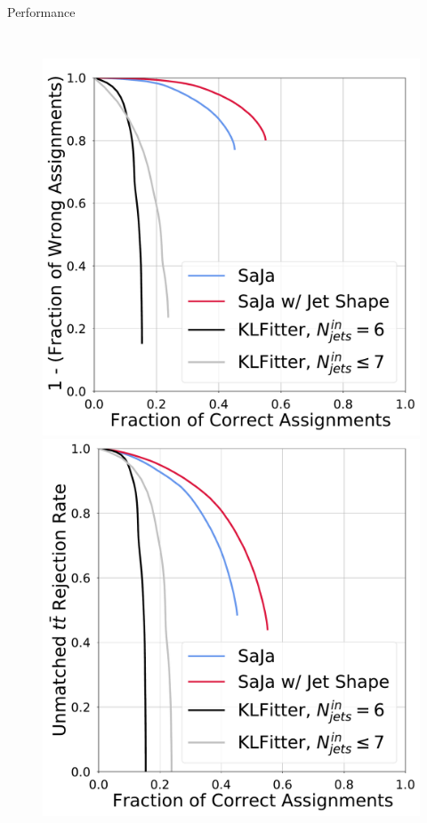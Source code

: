 \begin{frame}[fragile]{Performance}
\begin{columns}
      \begin{figure}
        \centering
        \includegraphics[height=0.32\textheight]{fig/roc/roc_wrong-rej_vs_correct.pdf}
        \includegraphics[height=0.32\textheight]{fig/roc/roc_unmathed-rej_vs_correct.pdf}

\end{figure}
\end{columns}
\end{frame}
